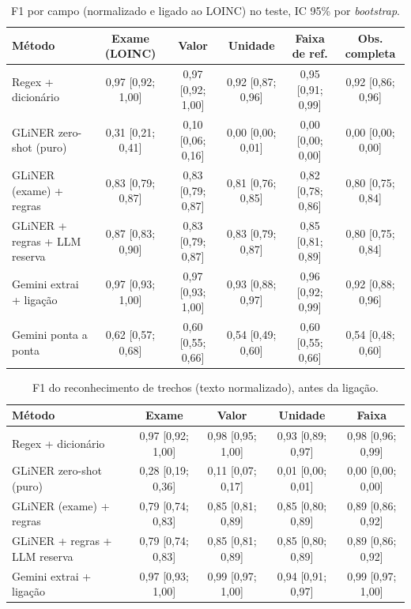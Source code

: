 \begin{table}[ht]\centering\small
\caption{F1 por campo (normalizado e ligado ao LOINC) no teste, IC 95\% por \textit{bootstrap}.}\label{tab:campos}
\begin{tabular}{lccccc}\toprule
Método & Exame (LOINC) & Valor & Unidade & Faixa de ref. & Obs. completa\\\midrule
Regex + dicionário & 0,97 [0,92; 1,00] & 0,97 [0,92; 1,00] & 0,92 [0,87; 0,96] & 0,95 [0,91; 0,99] & 0,92 [0,86; 0,96]\\
GLiNER zero-shot (puro) & 0,31 [0,21; 0,41] & 0,10 [0,06; 0,16] & 0,00 [0,00; 0,01] & 0,00 [0,00; 0,00] & 0,00 [0,00; 0,00]\\
GLiNER (exame) + regras & 0,83 [0,79; 0,87] & 0,83 [0,79; 0,87] & 0,81 [0,76; 0,85] & 0,82 [0,78; 0,86] & 0,80 [0,75; 0,84]\\
GLiNER + regras + LLM reserva & 0,87 [0,83; 0,90] & 0,83 [0,79; 0,87] & 0,83 [0,79; 0,87] & 0,85 [0,81; 0,89] & 0,80 [0,75; 0,84]\\
Gemini extrai + ligação & 0,97 [0,93; 1,00] & 0,97 [0,93; 1,00] & 0,93 [0,88; 0,97] & 0,96 [0,92; 0,99] & 0,92 [0,88; 0,96]\\
Gemini ponta a ponta & 0,62 [0,57; 0,68] & 0,60 [0,55; 0,66] & 0,54 [0,49; 0,60] & 0,60 [0,55; 0,66] & 0,54 [0,48; 0,60]\\
\bottomrule\end{tabular}\end{table}

\begin{table}[ht]\centering\small
\caption{F1 do reconhecimento de trechos (texto normalizado), antes da ligação.}\label{tab:spans}
\begin{tabular}{lcccc}\toprule
Método & Exame & Valor & Unidade & Faixa\\\midrule
Regex + dicionário & 0,97 [0,92; 1,00] & 0,98 [0,95; 1,00] & 0,93 [0,89; 0,97] & 0,98 [0,96; 0,99]\\
GLiNER zero-shot (puro) & 0,28 [0,19; 0,36] & 0,11 [0,07; 0,17] & 0,01 [0,00; 0,01] & 0,00 [0,00; 0,00]\\
GLiNER (exame) + regras & 0,79 [0,74; 0,83] & 0,85 [0,81; 0,89] & 0,85 [0,80; 0,89] & 0,89 [0,86; 0,92]\\
GLiNER + regras + LLM reserva & 0,79 [0,74; 0,83] & 0,85 [0,81; 0,89] & 0,85 [0,80; 0,89] & 0,89 [0,86; 0,92]\\
Gemini extrai + ligação & 0,97 [0,93; 1,00] & 0,99 [0,97; 1,00] & 0,94 [0,91; 0,97] & 0,99 [0,97; 1,00]\\
\bottomrule\end{tabular}\end{table}

